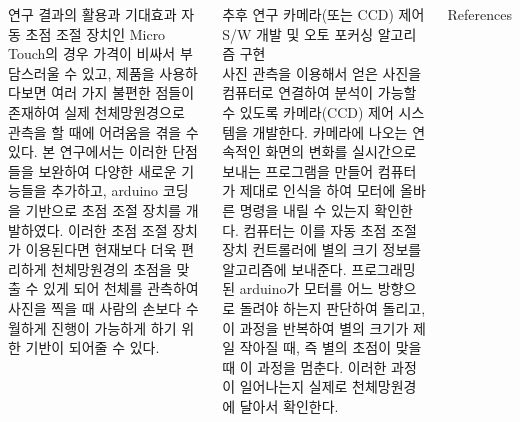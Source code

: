 \documentclass{gshs_poster_beamer}
\begin{document}
\begin{columns}[T]
\begin{posterbox}[colbacktitle=purple,coltitle=white,colback=purple!5]{연구 결과의 활용과 기대효과}
자동 초점 조절 장치인 Micro Touch의 경우 가격이 비싸서 부담스러울 수 있고, 제품을 사용하다보면 여러 가지 불편한 점들이 존재하여 실제 천체망원경으로 관측을 할 때에 어려움을 겪을 수 있다. 본 연구에서는 이러한 단점들을 보완하여 다양한 새로운 기능들을 추가하고, arduino 코딩을 기반으로 초점 조절 장치를 개발하였다. 이러한 초점 조절 장치가 이용된다면 현재보다 더욱 편리하게 천체망원경의 초점을 맞출 수 있게 되어 천체를 관측하여 사진을 찍을 때 사람의 손보다 수월하게 진행이 가능하게 하기 위한 기반이 되어줄 수 있다.
\end{posterbox}

\vspace{1em}

\begin{posterbox}[colbacktitle=brown,coltitle=white,colback=brown!5]{추후 연구}
	카메라(또는 CCD) 제어 S/W 개발 및 오토 포커싱 알고리즘 구현\\
	사진 관측을 이용해서 얻은 사진을 컴퓨터로 연결하여 분석이 가능할 수 있도록 카메라(CCD) 제어 시스템을 개발한다. 카메라에 나오는 연속적인 화면의 변화를 실시간으로 보내는 프로그램을 만들어 컴퓨터가 제대로 인식을 하여 모터에 올바른 명령을 내릴 수 있는지 확인한다. 컴퓨터는 이를 자동 초점 조절 장치 컨트롤러에 별의 크기 정보를 알고리즘에 보내준다. 프로그래밍 된 arduino가 모터를 어느 방향으로 돌려야 하는지 판단하여 돌리고, 이 과정을 반복하여 별의 크기가 제일 작아질 때, 즉 별의 초점이 맞을 때 이 과정을 멈춘다. 이러한 과정이 일어나는지 실제로 천체망원경에 달아서 확인한다.
\end{posterbox}

\vspace{1em}

\begin{posterbox}[colbacktitle=yellow,coltitle=black,colback=yellow!5]{References}
	

\end{posterbox}



\end{columns}
\end{document}
